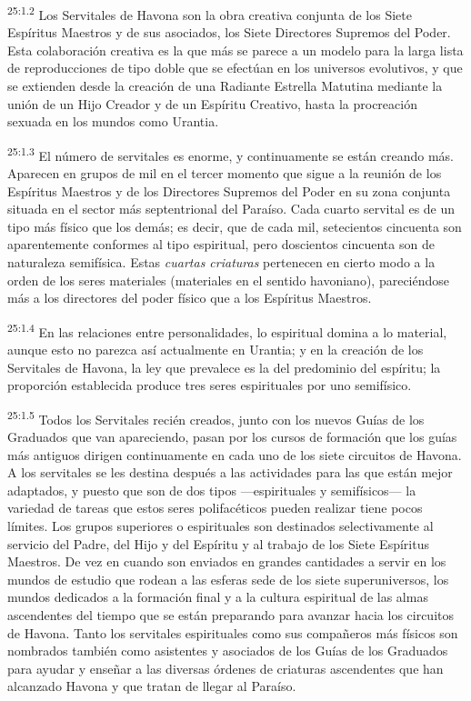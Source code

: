 \par
\textsuperscript{25:1.2} Los Servitales de Havona son la obra creativa conjunta de los Siete Espíritus Maestros y de sus asociados, los Siete Directores Supremos del Poder. Esta colaboración creativa es la que más se parece a un modelo para la larga lista de reproducciones de tipo doble que se efectúan en los universos evolutivos, y que se extienden desde la creación de una Radiante Estrella Matutina mediante la unión de un Hijo Creador y de un Espíritu Creativo, hasta la procreación sexuada en los mundos como Urantia.

\par
\textsuperscript{25:1.3} El número de servitales es enorme, y continuamente se están creando más. Aparecen en grupos de mil en el tercer momento que sigue a la reunión de los Espíritus Maestros y de los Directores Supremos del Poder en su zona conjunta situada en el sector más septentrional del Paraíso. Cada cuarto servital es de un tipo más físico que los demás; es decir, que de cada mil, setecientos cincuenta son aparentemente conformes al tipo espiritual, pero doscientos cincuenta son de naturaleza semifísica. Estas \textit{cuartas criaturas} pertenecen en cierto modo a la orden de los seres materiales (materiales en el sentido havoniano), pareciéndose más a los directores del poder físico que a los Espíritus Maestros.

\par
\textsuperscript{25:1.4} En las relaciones entre personalidades, lo espiritual domina a lo material, aunque esto no parezca así actualmente en Urantia; y en la creación de los Servitales de Havona, la ley que prevalece es la del predominio del espíritu; la proporción establecida produce tres seres espirituales por uno semifísico.

\par
\textsuperscript{25:1.5} Todos los Servitales recién creados, junto con los nuevos Guías de los Graduados que van apareciendo, pasan por los cursos de formación que los guías más antiguos dirigen continuamente en cada uno de los siete circuitos de Havona. A los servitales se les destina después a las actividades para las que están mejor adaptados, y puesto que son de dos tipos ---espirituales y semifísicos--- la variedad de tareas que estos seres polifacéticos pueden realizar tiene pocos límites. Los grupos superiores o espirituales son destinados selectivamente al servicio del Padre, del Hijo y del Espíritu y al trabajo de los Siete Espíritus Maestros. De vez en cuando son enviados en grandes cantidades a servir en los mundos de estudio que rodean a las esferas sede de los siete superuniversos, los mundos dedicados a la formación final y a la cultura espiritual de las almas ascendentes del tiempo que se están preparando para avanzar hacia los circuitos de Havona. Tanto los servitales espirituales como sus compañeros más físicos son nombrados también como asistentes y asociados de los Guías de los Graduados para ayudar y enseñar a las diversas órdenes de criaturas ascendentes que han alcanzado Havona y que tratan de llegar al Paraíso.

